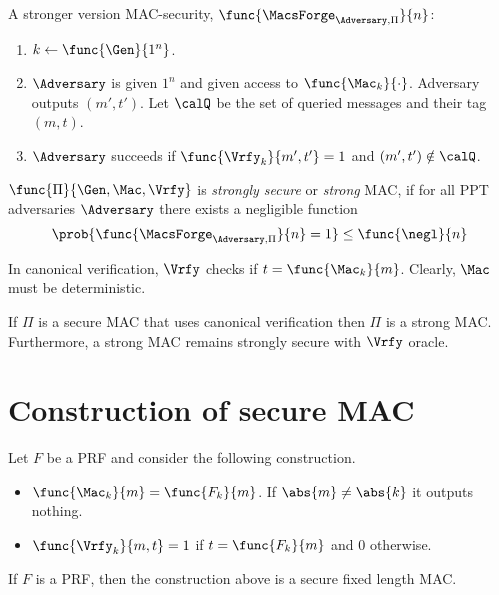 A stronger version MAC-security, \(\func{\MacsForge_{\Adversary, \Pi}}{n}\):
\begin{enumerate}
    \item \(k \gets \func{\Gen}{1^n}\).
    \item \(\Adversary\) is given \(1^n\) and given access to \(\func{\Mac_k}{\cdot}\). Adversary outputs \((m',t')\). Let \(\calQ\) be the set of queried messages and their tag \((m,t)\).
    \item \(\Adversary\) succeeds if \(\func{\Vrfy_k}{m',t'} = 1\) and \((m',t') \notin \calQ\).
\end{enumerate}

\begin{definition}
    \(\func{\Pi}{\Gen,\Mac, \Vrfy}\) is \textit{strongly secure} or \textit{strong} MAC, if for all PPT adversaries \(\Adversary\) there exists a negligible function 
    \begin{equation*}
        \prob{\func{\MacsForge_{\Adversary,\Pi}}{n} = 1} \leq \func{\negl}{n}
    \end{equation*}
\end{definition}

In canonical verification, \(\Vrfy\) checks if \(t = \func{\Mac_k}{m}\). Clearly, \(\Mac\) must be deterministic. 
\begin{proposition}
    If \(\Pi\) is a secure MAC that uses canonical verification then \(\Pi\) is a strong MAC. Furthermore, a strong MAC remains strongly secure with \(\Vrfy\) oracle.
\end{proposition}

\section{Construction of secure MAC}
Let \(F\) be a PRF and consider the following construction. 
\begin{itemize}
    \item \(\func{\Mac_k}{m} = \func{F_k}{m}\). If \(\abs{m} \neq \abs{k}\) it outputs nothing.
    \item \(\func{\Vrfy_k}{m,t} = 1\) if \(t = \func{F_k}{m}\) and \(0\) otherwise.
\end{itemize}
\begin{theorem}
    If \(F\) is a PRF, then the construction above is a secure fixed length MAC.
\end{theorem}

